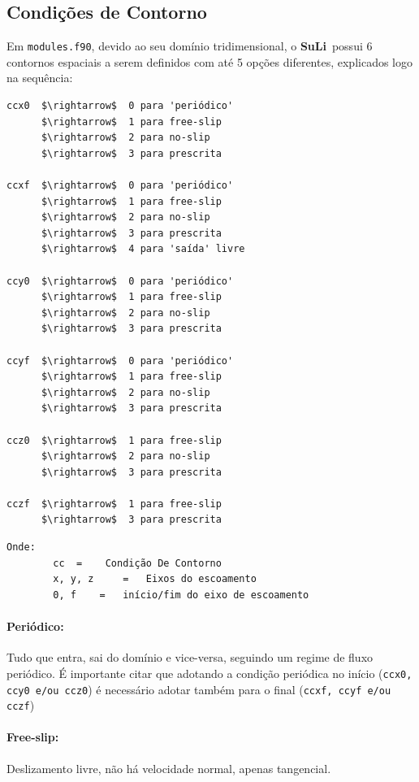 \documentclass[12pt, a4paper]{article}
\newcommand{\SL}{{\bf SuLi}}
\begin{document}

\subsection{Condições de Contorno}
Em \verb|modules.f90|, devido ao seu domínio tridimensional, o \SL\ possui 6 contornos espaciais a serem definidos com até 5 opções diferentes, explicados logo na sequência:
\begin{lstlisting}[escapeinside='']
ccx0  $\rightarrow$  0 para 'periódico'
      $\rightarrow$  1 para free-slip
      $\rightarrow$  2 para no-slip
      $\rightarrow$  3 para prescrita

ccxf  $\rightarrow$  0 para 'periódico'
      $\rightarrow$  1 para free-slip
      $\rightarrow$  2 para no-slip
      $\rightarrow$  3 para prescrita
      $\rightarrow$  4 para 'saída' livre
      
ccy0  $\rightarrow$  0 para 'periódico'
      $\rightarrow$  1 para free-slip
      $\rightarrow$  2 para no-slip
      $\rightarrow$  3 para prescrita
      
ccyf  $\rightarrow$  0 para 'periódico'
      $\rightarrow$  1 para free-slip
      $\rightarrow$  2 para no-slip
      $\rightarrow$  3 para prescrita
      
ccz0  $\rightarrow$  1 para free-slip
      $\rightarrow$  2 para no-slip
      $\rightarrow$  3 para prescrita
      
cczf  $\rightarrow$  1 para free-slip
      $\rightarrow$  3 para prescrita
\end{lstlisting}

\begin{verbatim}
Onde: 	
		cc 	=	 Condição De Contorno
		x, y, z 	=	Eixos do escoamento
		0, f	= 	início/fim do eixo de escoamento
\end{verbatim}

\paragraph{Periódico:} Tudo que entra, sai do domínio e vice-versa, seguindo um regime de fluxo periódico. É importante citar que adotando a condição periódica no início (\verb|ccx0, ccy0 e/ou ccz0|) é necessário adotar também para o final (\verb|ccxf, ccyf e/ou cczf|)
\paragraph{Free-slip:} Deslizamento livre, não há velocidade normal, apenas tangencial.
\end{document}
